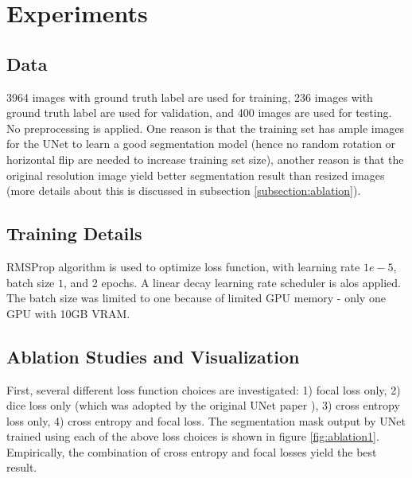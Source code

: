 \documentclass{article}
\begin{document}
\section{Experiments}

\subsection{Data}   %

    3964 images with ground truth label are used for training, 236 images
    with ground truth label are used for validation, and 400 images are used for testing.
    No preprocessing is applied. One reason is that the training set has ample images for the UNet to learn a
    good segmentation model (hence no random rotation or horizontal flip are needed
    to increase training set size), another reason is that the original resolution
    image yield better segmentation result than resized images (more details about
    this is discussed in subsection \ref{subsection:ablation}). 

\subsection{Training Details}   %

    RMSProp algorithm is used to optimize loss function, with learning rate $1e-5$, batch size
    $1$, and 2 epochs. A linear decay learning rate scheduler is alos applied. The batch size was limited to one because of limited GPU memory - 
    only one GPU with 10GB VRAM. 

\subsection{Ablation Studies and Visualization\label{subsection:ablation}}   %

    First, several different loss function choices are investigated: 1) focal loss only, 
    2) dice loss only (which was adopted by the original UNet paper \cite{unet}), 
    3) cross entropy loss only, 4) cross entropy and focal loss. The segmentation 
    mask output by UNet trained using each of the above loss choices is shown in figure \ref{fig:ablation1}.
    Empirically, the combination of cross entropy and focal losses yield the best result.
\end{document}
